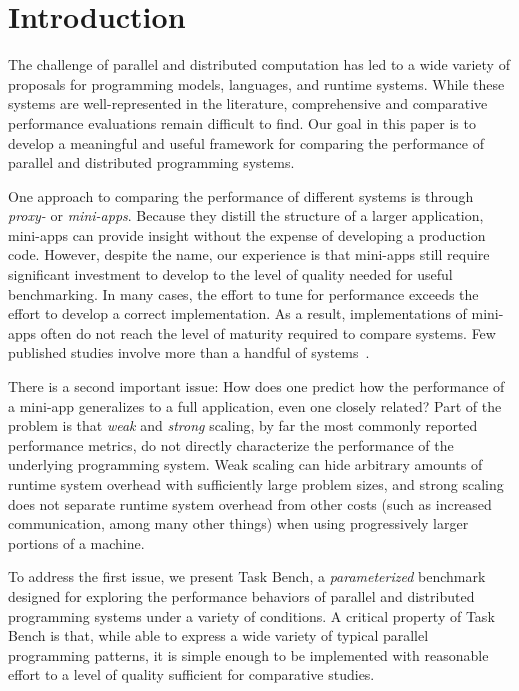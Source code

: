 \section{Introduction}
\label{sec:introduction}

The challenge of parallel and distributed computation has led to a
wide variety of proposals for programming models, languages, and
runtime systems. While these systems are well-represented in the literature, comprehensive and comparative performance evaluations
remain difficult to find. Our
goal in this paper is to develop a meaningful and useful framework for
comparing the performance of parallel and distributed programming
systems.



One approach to comparing the performance of different systems is through \emph{proxy-} or
\emph{mini-apps}. Because they distill the structure of a larger
application, mini-apps can provide insight
without the expense of developing a production code. However, despite the name, our experience is that
mini-apps still require significant investment to develop
to the level of quality needed for useful benchmarking. In many cases,
the effort to tune for performance exceeds the effort to develop a correct implementation. As a result, implementations of mini-apps
often do not reach the level of maturity required to compare
systems. Few published studies involve more than a handful of systems~\cite{LULESH13}.

There is a second important issue: How does one predict how
the performance of a mini-app generalizes to a full
application, even one closely related? Part of the problem is
that \emph{weak} and \emph{strong} scaling, by far the most commonly
reported performance metrics,
do not directly characterize the performance of the underlying
programming system. Weak scaling can hide arbitrary amounts of runtime
system overhead with sufficiently large problem sizes, and strong
scaling does not separate runtime system overhead from other costs
(such as increased communication, among many other things) when
using progressively larger portions of a machine.

To address the first issue, we present Task Bench, a
\emph{parameterized} benchmark designed for exploring the performance
behaviors of parallel and distributed programming systems under a
variety of conditions. A critical property of Task Bench is that,
while able to express a wide variety of typical parallel programming
patterns, it is simple enough to be implemented with reasonable effort
to a level of quality sufficient for comparative studies.


